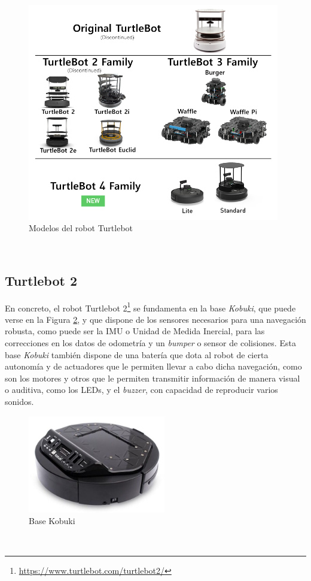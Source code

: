 \begin{figure} [h!]
  \begin{center}
    \includegraphics[width=11cm]{figs/turtlebot_family}
  \end{center}
  \caption{Modelos del robot Turtlebot \cite{turtlebot4}}
  \label{fig:turtlebots}
\end{figure}\

\subsection{Turtlebot 2}
\label{sec:turtlebot2}

En concreto, el robot Turtlebot 2\footnote{
\href{https://www.turtlebot.com/turtlebot2/}{https://www.turtlebot.com/turtlebot2/}}
se fundamenta en la base \textit{Kobuki}, que puede verse en la Figura
\ref{fig:base_kobuki}, y que dispone de los sensores necesarios para una
navegación robusta, como puede ser la IMU o Unidad de Medida Inercial, para las
correcciones en los datos de odometría y un \textit{bumper} o sensor de
colisiones.
Esta base \textit{Kobuki} también dispone de una batería que dota al robot de
cierta autonomía y de actuadores que le permiten llevar a cabo dicha navegación,
como son los motores y otros que le permiten transmitir información de manera
visual o auditiva, como los LEDs, y el \textit{buzzer}, con capacidad de
reproducir varios sonidos.
\\

\begin{figure} [h!]
  \begin{center}
    \includegraphics[width=6cm]{figs/kobuki_base}
  \end{center}
  \caption{Base Kobuki \cite{kobuki_base}}
  \label{fig:base_kobuki}
\end{figure}\

